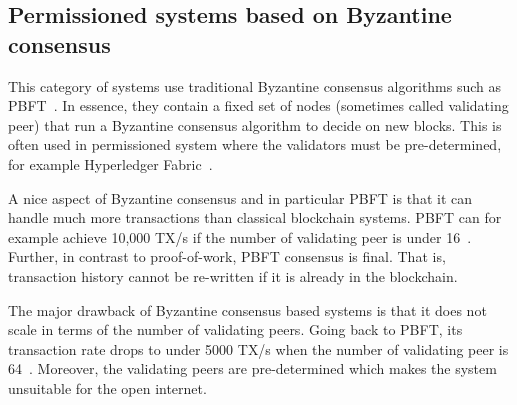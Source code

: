 

\subsection{Permissioned systems based on Byzantine consensus}

This category of systems use traditional Byzantine consensus algorithms such as PBFT~\cite{castro1999practical}.
In essence, they contain a fixed set of nodes (sometimes called validating peer) that run a Byzantine consensus algorithm to decide on new blocks.
This is often used in permissioned system where the validators must be pre-determined,
for example Hyperledger Fabric~\cite{cachin2016architecture}.

A nice aspect of Byzantine consensus and in particular PBFT is that it can handle much more transactions than classical blockchain systems.
PBFT can for example achieve 10,000 TX/s if the number of validating peer is under 16~\cite[Section 5.2]{miller2016honey}.
Further, in contrast to proof-of-work, PBFT consensus is final.
That is, transaction history cannot be re-written if it is already in the blockchain.

The major drawback of Byzantine consensus based systems is that it does not scale in terms of the number of validating peers.
Going back to PBFT, its transaction rate drops to under 5000 TX/s when the number of validating peer is 64~\cite[Section 5.2]{miller2016honey}.
Moreover, the validating peers are pre-determined which makes the system unsuitable for the open internet.


